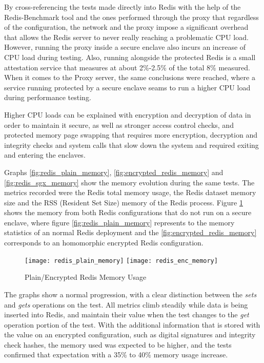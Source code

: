 By cross-referencing the tests made directly into Redis with the help of the Redis-Benchmark tool and the ones performed through the proxy that regardless of the configuration, the network and the proxy impose a significant overhead that allows the Redis server to never really reaching a problematic \gls{CPU} load. However, running the proxy inside a secure enclave also incurs an increase of \gls{CPU} load during testing. Also, running alongside the protected Redis is a small attestation service that measures at about 2\%-2.5\% of the total 8\% measured. When it comes to the Proxy server, the same conclusions were reached, where a service running protected by a secure enclave seams to run a higher \gls{CPU} load during performance testing.

Higher \gls{CPU} loads can be explained with encryption and decryption of data in order to maintain it secure, as well as stronger access control checks, and protected memory page swapping that requires more encryption, decryption and integrity checks and system calls that slow down the system and required exiting and entering the enclaves.

Graphs \ref{fig:redis_plain_memory}, \ref{fig:encrypted_redis_memory} and \ref{fig:redis_sgx_memory} show the memory evolution during the same tests. The metrics recorded were the Redis total memory usage, the Redis dataset memory size and the \gls{RSS} (Resident Set Size) memory of the Redis process. Figure \ref {fig:redis_plain_enc_memory_results} shows the memory from both Redis configurations that do not run on a secure enclave, where figure \ref{fig:redis_plain_memory} represents to the memory statistics of an normal Redis deployment and the  \ref{fig:encrypted_redis_memory} corresponds to an homomorphic encrypted Redis configuration.

\begin{figure}[htbp]
\hspace*{-8mm}
  \centering
    {\texttt{[image: redis\_plain\_memory]}}%
    {\texttt{[image: redis\_enc\_memory]}}%
  \caption{Plain/Encrypted Redis Memory Usage}
  \label{fig:redis_plain_enc_memory_results}
\end{figure}

The graphs show a normal progression, with a clear distinction between the \textit{sets} and \textit{gets} operations on the test. All metrics climb steadily while data is being inserted into Redis, and maintain their value when the test changes to the \textit{get} operation portion of the test. With the additional information that is stored with the value on an encrypted configuration, such as digital signatures and integrity check hashes, the memory used was expected to be higher, and the tests confirmed that expectation with a 35\% to 40\% memory usage increase.

